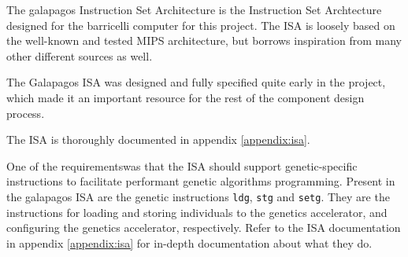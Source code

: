 The \Gls{galapagos} Instruction Set Architecture is the Instruction Set Archtecture designed for the \Gls{barricelli} computer for this project.
The ISA is loosely based on the well-known and tested MIPS architecture\cn, but borrows inspiration from many other different sources as well.

The Galapagos ISA was designed and fully specified quite early in the project, which made it an important resource for the rest of the component design process.

The ISA is thoroughly documented in appendix \vref{appendix:isa}.

One of the requirements\cn was that the ISA should support genetic-specific instructions to facilitate performant genetic algorithms programming.
Present in the \Gls{galapagos} ISA are the genetic instructions \texttt{ldg}, \texttt{stg} and \texttt{setg}.
They are the instructions for loading and storing \glspl{individual} to the genetics accelerator, and configuring the genetics accelerator, respectively.
Refer to the ISA documentation in appendix \vref{appendix:isa} for in-depth documentation about what they do.

